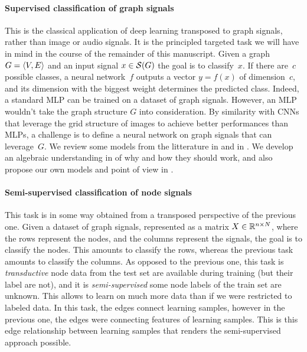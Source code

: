 \paragraph{Supervised classification of graph signals}
This is the classical application of deep learning transposed to graph signals, rather than image or audio signals. It is the principled targeted task we will have in mind in the course of the remainder of this manuscript. Given a graph $G = \langle V, E \rangle$ and an input signal $x \in \mathcal{S}(G)$ the goal is to classify~$x$. If there are~$c$ possible classes, a neural network~$f$ outputs a vector $y = f(x)$ of dimension~$c$, and its dimension with the biggest weight determines the predicted class. Indeed, a standard MLP can be trained on a dataset of graph signals. However, an MLP wouldn't take the graph structure $G$ into consideration. By similarity with CNNs that leverage the grid structure of images to achieve better performances than MLPs, a challenge is to define a neural network on graph signals that can leverage~$G$. We review some models from the litterature in  and in . We develop an algebraic understanding in  of why and how they should work, and also propose our own models and point of view in .

\paragraph{Semi-supervised classification of node signals}
This task is in some way obtained from a transposed perspective of the previous one. Given a dataset of graph signals, represented as a matrix $X \in \mathbb{R}^{n \times N}$, where the rows represent the nodes, and the columns represent the signals, the goal is to classify the nodes. This amounts to classify the rows, whereas the previous task amounts to classify the columns. As opposed to the previous one, this task is \emph{transductive} \ie node data from the test set are available during training (but their label are not), and it is \emph{semi-supervised} \ie some node labels of the train set are unknown. This allows to learn on much more data than if we were restricted to labeled data. In this task, the edges connect learning samples, however in the previous one, the edges were connecting features of learning samples. This is this edge relationship between learning samples that renders the semi-supervised approach possible.


